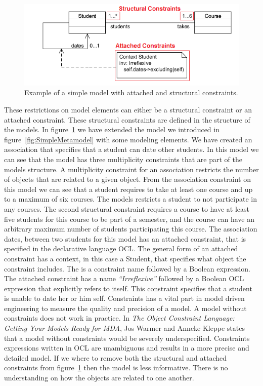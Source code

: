 \begin{figure}[H]
	\centering
	\includegraphics[scale=0.7]{./Figures/Constraints.png}
	\caption[Simple model with constraints]
	{Example of a simple model with attached and structural constraints.}
	\label{fig:Constraints}
\end{figure}

These restrictions on model elements can either be a structural constraint or an
attached constraint. These structural constraints are defined in the structure
of the models. In figure~\ref{fig:Constraints} we have extended the model we
introduced in figure~\ref{fig:SimpleMetamodel} with some  modeling elements. We
have created an association that specifies that a student can date other
students. In this model we can see that the model has three multiplicity
constraints that are part of the models structure. A multiplicity constraint for
an association restricts the number of objects that are related to a given
object. From the association constraint on this model we can see that a student
requires to take at least one course and up to a maximum of six courses. The
models restricts a student to not participate in any courses. The second
structural constraint requires a course to have at least five students for
this course to be part of a semester, and the course can have an arbitrary
maximum number of students participating this course. The association dates,
between two students for this model has an attached constraint, that is
specified in the declarative language OCL. The general form of an attached
constraint has a context, in this case a Student, that specifies what object the
constraint includes. The is a constraint name followed by a Boolean
expression. The attached constraint has a name \textit{``Irreflexive''} followed
by a Boolean OCL expression that explicitly refers to itself. This constraint
specifies that a student is unable to date her or him self. Constraints has a
vital part in model driven engineering to measure the quality and precision of a
model. A model without constraints does not work in practice. In
\textit{The Object Constraint Language: Getting Your Models Ready for
MDA}\cite{Warmer:2003:OCL:861416}, Jos Warmer and Anneke Kleppe states that a
model without constraints would be severely underspecified. Constraints
expressions written in OCL are unambiguous and results in a more precise and
detailed model. If we where to remove both the structural and attached
constraints from figure~\ref{fig:Constraints} then the model is less
informative. There is no understanding on how the objects are related to
one another. 

